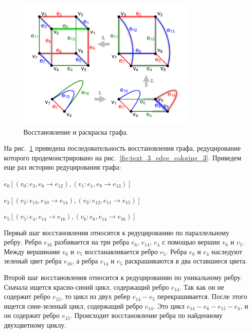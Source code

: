 \begin{figure}[ht]
\centering
\includegraphics[width=0.8\textwidth]{./pics/text_3_edge_coloring/8-restore-and-repaint.pdf}
\singlespacing
{}\caption{Восстановление и раскраска графа.}
\label{fig:text_3_edge_coloring_8}
\end{figure}

На рис.~\ref{fig:text_3_edge_coloring_8} приведена последовательность восстановления графа, редуцирование которого продемонстрировано на рис.~\ref{fig:text_3_edge_coloring_3}.
Приведем еще раз историю редуцирования графа:

$e_0 [(v_0 : e_3, e_8 \rightarrow e_{12}), (v_1 : e_1, e_9 \rightarrow e_{13})]$

$e_2 [(v_2 : e_{13}, e_{10} \rightarrow e_{14}), (v_3 : e_{12}, e_{11} \rightarrow e_{15})]$

$e_5 [(v_5 : e_4, e_{14} \rightarrow e_{16}), (v_6 : e_6, e_{14} \rightarrow e_{16})]$

Первый шаг восстановления относится к редуцированию по параллельному ребру.
Ребро $e_{16}$ разбивается на три ребра $e_6$, $e_{14}$, $e_4$ с помощью вершин $v_6$ и $v_5$.
Между вершинами $v_6$ и $v_5$ восстанавливается ребро $e_5$.
Ребра $e_6$ и $e_4$ наследуют зеленый цвет ребра $e_{16}$, а ребра $e_{14}$ и $e_5$ раскрашиваются в два оставшиеся цвета.

Второй шаг восстановления относится к редуцированию по уникальному ребру.
Сначала ищется красно-синий цикл, содержащий ребро $e_{14}$.
Так как он не содержит ребро $e_{15}$, то цикл из двух ребер $e_{14}-e_5$ перекрашивается.
После этого ищется сине-зеленый цикл, содержащий ребро $e_{14}$.
Это цикл $e_{14}-e_6-e_{15}-e_4$, и он содержит ребро $e_{15}$.
Происходит восстановление ребра по найденному двухцветному циклу.

